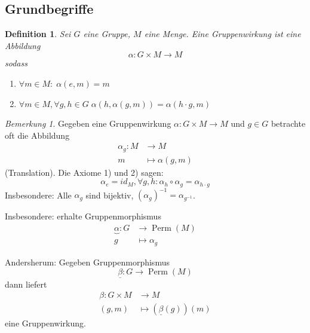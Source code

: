 \documentclass[a4paper,12pt,numbers=noenddot,parskip=full]{scrartcl}
\theoremstyle{dotless}
\newtheorem{definition}[theorem]{Definition}
\theoremstyle{remark}
\newtheorem*{remark}{Bemerkung}
\begin{document}
	\subsection{Grundbegriffe}
	
	\begin{definition}
		Sei $G$ eine Gruppe, $M$ eine Menge. Eine Gruppenwirkung ist eine Abbildung
		\begin{equation*}
			\alpha: G \times M \to M
		\end{equation*}
		sodass
		\begin{enumerate}
			\item $\forall m \in M: \; \alpha(e,m) = m$
			\item $\forall m \in M, \forall g,h \in G \; \alpha(h, \alpha(g,m)) = \alpha(h \cdot g, m)$
		\end{enumerate}
	\end{definition}

	\begin{remark}
		Gegeben eine Gruppenwirkung $\alpha: G \times M \to M$ und $g \in G$ betrachte oft die Abbildung
		\begin{align*}
			\alpha_g: M &\longrightarrow M\\
			m &\longmapsto \alpha(g,m)
		\end{align*}
		(Translation). Die Axiome 1) und 2) sagen:
		\begin{equation*}
			\alpha_e = id_M, \forall g,h: \alpha_h \circ \alpha_g = \alpha_{h \cdot g}
		\end{equation*}
		Insbesondere: Alle $\alpha_g$ sind bijektiv, $(\alpha_g)^{-1} = \alpha_{g^{-1}}$.
		
		Insbesondere: erhalte Gruppenmorphismus
		\begin{align*}
			\underbrace{\alpha}: G &\longrightarrow \operatorname{Perm}(M) \\
			g &\longmapsto \alpha_g
		\end{align*}
		
		Andersherum: Gegeben Gruppenmorphismus
		\begin{equation*}
			\underline{\beta}: G \to \operatorname{Perm}(M)
		\end{equation*}
		dann liefert
		\begin{align*}
			\beta: G \times M &\longrightarrow M \\
			(g,m) &\longmapsto (\underline{\beta}(g))(m)
		\end{align*}
		eine Gruppenwirkung.
	\end{remark}
\end{document}

